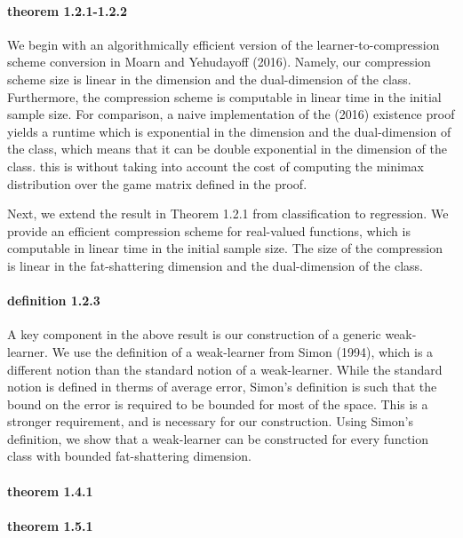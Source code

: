 \documentclass{article}
\begin{document}
\paragraph{theorem 1.2.1-1.2.2}
We begin with an algorithmically efficient version of the learner-to-compression scheme conversion in Moarn and Yehudayoff (2016).
Namely, our compression scheme size is linear in the dimension and the dual-dimension of the class. 
Furthermore, the compression scheme is computable in linear time in the initial sample size. 
For comparison,  a naive implementation of the   (2016) existence proof yields a runtime which is exponential in the dimension and the dual-dimension of the class, which means that it can be double exponential in the dimension of the class. this is without taking into account the cost of computing the minimax distribution over the game matrix defined in the proof. 

Next, we extend the result in Theorem 1.2.1 from classification to regression.
We provide an efficient  compression scheme for real-valued functions, which is computable in linear time in the initial sample size. The size of the compression is linear in the fat-shattering dimension and the dual-dimension of the class. 

\paragraph{definition 1.2.3}
A key component in the above result is our construction of a generic weak-learner.
We use the definition of a weak-learner from Simon (1994), which is a different notion than the standard notion of a weak-learner.
While the standard notion is defined in therms of average error, Simon's definition is such that the bound on the error is required to be bounded for most of the space.
This is a stronger requirement, and is necessary for our construction.
Using Simon's definition, we show that a weak-learner can be constructed for every function class with bounded fat-shattering dimension.

\paragraph{theorem 1.4.1}

\paragraph{theorem 1.5.1}
\end{document}
